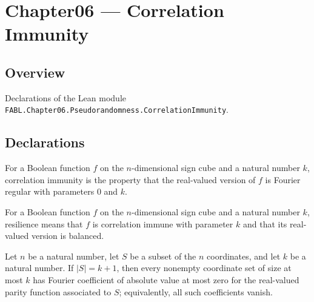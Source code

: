 \chapter{Chapter06 — Correlation Immunity}
\section{Overview}

Declarations of the Lean module \texttt{FABL.Chapter06.Pseudorandomness.CorrelationImmunity}.

\section{Declarations}

\begin{definition}
\label{FABL.IsCorrelationImmune}
\leanok
{}
For a Boolean function $f$ on the $n$-dimensional sign cube and a natural number $k$,
correlation immunity is the property that the real-valued version of $f$ is Fourier
regular with parameters $0$ and $k$.
\end{definition}

\begin{definition}[Resilience]
\label{FABL.IsResilient}
\leanok
{}
For a Boolean function $f$ on the $n$-dimensional sign cube and a natural number $k$,
resilience means that $f$ is correlation immune with parameter $k$ and that its
real-valued version is balanced.
\end{definition}

\begin{theorem}
\label{FABL.parityFunction_isCorrelationImmune}
\leanok
{}
Let $n$ be a natural number, let $S$ be a subset of the $n$ coordinates, and let $k$ be
a natural number. If $|S|=k+1$, then every nonempty coordinate set of size at most $k$
has Fourier coefficient of absolute value at most zero for the real-valued parity
function associated to $S$; equivalently, all such coefficients vanish.
\end{theorem}

